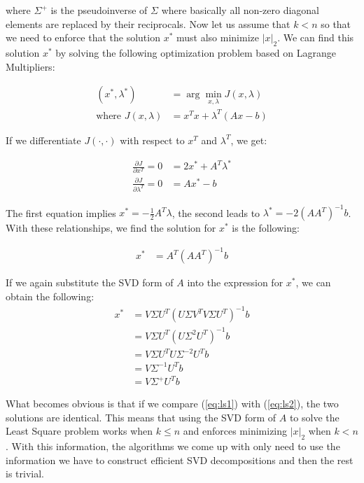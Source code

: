 \documentclass{article}[11pt]
\begin{document}
   where $\Sigma^{+}$ is the pseudoinverse of $\Sigma$ where basically all non-zero diagonal elements are replaced by their reciprocals. Now let us assume that $k < n$ so that we need to enforce that the solution $x^*$ must also minimize $|x|_2$. We can find this solution $x^*$ by solving the following optimization problem based on Lagrange Multipliers:
   
   \begin{align*}
   (x^*,\lambda^*) &= \arg \min_{x,\lambda} J(x,\lambda) \\
   \text{where } J(x,\lambda) &= x^Tx + \lambda^T\left(Ax - b\right)
   \end{align*}
   
    If we differentiate $J(\cdot,\cdot)$ with respect to $x^T$ and $\lambda^T$, we get:
    
    \begin{align*}
    \frac{\partial J}{\partial x^T} = 0 &= 2x^* + A^T\lambda^* \\
    \frac{\partial J}{\partial \lambda^T} = 0 &= Ax^* - b
    \end{align*}
    
    The first equation implies $x^* = -\frac{1}{2} A^T \lambda$, the second leads to $\lambda^* = -2 (A A^T)^{-1}b$. With these relationships, we find the solution for $x^*$ is the following:
    
    \begin{align*}
    x^* &= A^T \left(A A^T\right)^{-1}b
    \end{align*}
    
    If we again substitute the SVD form of $A$ into the expression for $x^*$, we can obtain the following:
    \begin{align}
   x^* &= V \Sigma U^T \left( U \Sigma V^T V \Sigma U^T \right)^{-1} b \nonumber  \\
   &=V \Sigma U^T \left( U \Sigma^2 U^T \right)^{-1} b \nonumber \\
   &= V \Sigma U^T U \Sigma^{-2} U^T  b \nonumber \\
   &= V \Sigma^{-1} U^T  b \nonumber \\
   &= V \Sigma^{+} U^T  b \label{eq:ls2}
   \end{align}    
    
    What becomes obvious is that if we compare (\ref{eq:ls1}) with (\ref{eq:ls2}), the two solutions are identical. This means that using the SVD form of $A$ to solve the Least Square problem works when $k \leq n$ and enforces minimizing $|x|_2$ when $k < n$. With this information, the algorithms we come up with only need to use the information we have to construct efficient SVD decompositions and then the rest is trivial.
   
\end{document}
